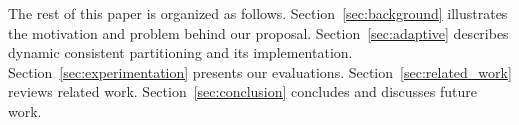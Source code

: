 The rest of this paper is organized as
follows. Section~\ref{sec:background} illustrates the motivation and
problem behind our proposal.  Section~\ref{sec:adaptive} describes
dynamic consistent partitioning and its
implementation. Section~\ref{sec:experimentation} presents our
evaluations.  Section~\ref{sec:related_work} reviews related
work. Section~\ref{sec:conclusion} concludes and discusses
future work.
  

